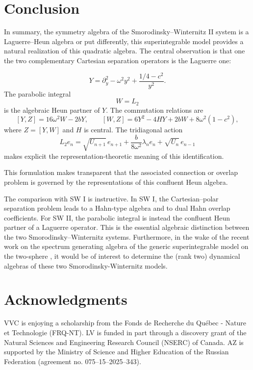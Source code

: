 \documentclass[11pt]{article}
\numberwithin{equation}{section}
\theoremstyle{definition}
\theoremstyle{remark}
\begin{document}
\section{Conclusion}

In summary, the symmetry algebra of the Smorodinsky--Winternitz II system is a Laguerre--Heun algebra or put differently, this superintegrable model provides a natural
realization of this quadratic algebra.  The central observation is that one the two complementary Cartesian separation operators is the Laguerre one:

\[
        Y=
        \partial_y^2-\omega^2y^2+\frac{1/4-c^2}{y^2}.
\]
The parabolic integral
\[
        W=L_2
\]
is the algebraic Heun partner of \(Y\).  The commutation relations are
\[
 [Y,Z]=16\omega^2W-2bY,
 \qquad
 [W,Z]=6Y^2-4HY+2bW+8\omega^2(1-c^2),
\]
where \(Z=[Y,W]\) and \(H\) is central.  The tridiagonal action
\[
        L_2 e_n
        =
        \sqrt{U_{n+1}}\, e_{n+1}
        +
        \frac{b}{8\omega^2}\lambda_n e_n
        +
        \sqrt{U_n}\, e_{n-1}
\]
makes explicit the representation-theoretic meaning of this identification.

This formulation makes transparent that the associated connection or overlap problem is
governed by the representations of this confluent Heun algebra.

The comparison with SW I is instructive.  In SW I, the Cartesian--polar
separation problem leads to a Hahn-type algebra and to dual Hahn overlap
coefficients.  For SW II, the parabolic integral is instead the confluent
Heun partner of a Laguerre operator.  This is the essential algebraic
distinction between the two Smorodinsky--Winternitz systems. Furthermore, in the wake of the recent work on the spectrum generating algebra of the generic superintegrable model on the two-sphere \cite{Crampe2026dyn}, it would be of interest to determine the (rank two) dynamical algebras of these two Smorodinsky-Winternitz models.

\section*{Acknowledgments}

VVC is enjoying a scholarship from the Fonds de Recherche du Québec - Nature et Technologie (FRQ-NT). LV is funded in part through a discovery grant of the Natural Sciences and Engineering Research Council (NSERC) of Canada. 
 AZ is supported by the Ministry of Science and Higher Education of the Russian Federation (agreement no. 075--15--2025--343).
 
\end{document}
